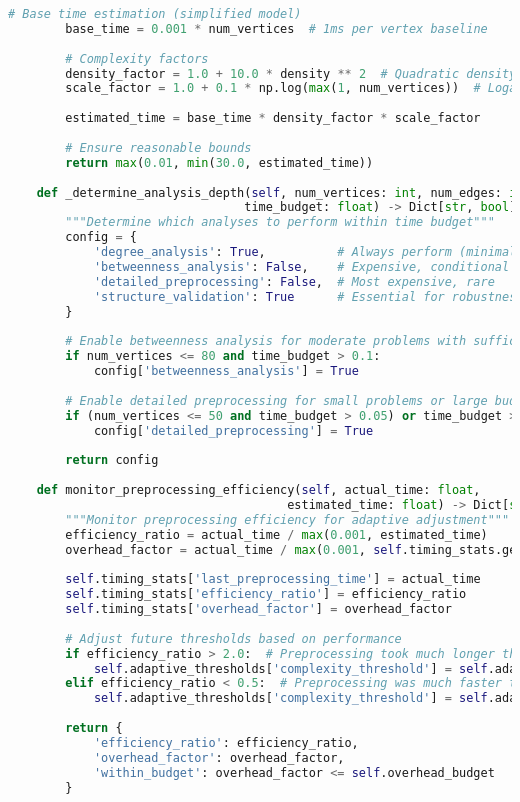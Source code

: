 \begin{lstlisting}[language=Python, caption=Adaptive Timing Coordination for Consistent Overhead]
        # Base time estimation (simplified model)
        base_time = 0.001 * num_vertices  # 1ms per vertex baseline
        
        # Complexity factors
        density_factor = 1.0 + 10.0 * density ** 2  # Quadratic density impact
        scale_factor = 1.0 + 0.1 * np.log(max(1, num_vertices))  # Logarithmic scale impact
        
        estimated_time = base_time * density_factor * scale_factor
        
        # Ensure reasonable bounds
        return max(0.01, min(30.0, estimated_time))
    
    def _determine_analysis_depth(self, num_vertices: int, num_edges: int, 
                                 time_budget: float) -> Dict[str, bool]:
        """Determine which analyses to perform within time budget"""
        config = {
            'degree_analysis': True,          # Always perform (minimal cost)
            'betweenness_analysis': False,    # Expensive, conditional
            'detailed_preprocessing': False,  # Most expensive, rare
            'structure_validation': True      # Essential for robustness
        }
        
        # Enable betweenness analysis for moderate problems with sufficient budget
        if num_vertices <= 80 and time_budget > 0.1:
            config['betweenness_analysis'] = True
        
        # Enable detailed preprocessing for small problems or large budget
        if (num_vertices <= 50 and time_budget > 0.05) or time_budget > 0.5:
            config['detailed_preprocessing'] = True
        
        return config
    
    def monitor_preprocessing_efficiency(self, actual_time: float, 
                                       estimated_time: float) -> Dict[str, float]:
        """Monitor preprocessing efficiency for adaptive adjustment"""
        efficiency_ratio = actual_time / max(0.001, estimated_time)
        overhead_factor = actual_time / max(0.001, self.timing_stats.get('baseline_time', 1.0))
        
        self.timing_stats['last_preprocessing_time'] = actual_time
        self.timing_stats['efficiency_ratio'] = efficiency_ratio
        self.timing_stats['overhead_factor'] = overhead_factor
        
        # Adjust future thresholds based on performance
        if efficiency_ratio > 2.0:  # Preprocessing took much longer than expected
            self.adaptive_thresholds['complexity_threshold'] = self.adaptive_thresholds.get('complexity_threshold', 0.5) * 0.8
        elif efficiency_ratio < 0.5:  # Preprocessing was much faster than expected
            self.adaptive_thresholds['complexity_threshold'] = self.adaptive_thresholds.get('complexity_threshold', 0.5) * 1.2
        
        return {
            'efficiency_ratio': efficiency_ratio,
            'overhead_factor': overhead_factor,
            'within_budget': overhead_factor <= self.overhead_budget
        }
\end{lstlisting}
